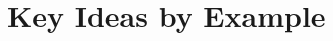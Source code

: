 \documentclass[acmsmall,review,anonymous]{acmart}\settopmatter{printfolios=true,printccs=false,printacmref=false}
\newcommand*{\rsp}{\textsc{sp}}
\begin{document}
%
%
%
%
%
%
%
%
%

\section{Key Ideas by Example}
\label{sec:running-example}

\newcommand{\mainsealc}{cyan}
\newcommand{\fsealc}{green}
\newcommand{\unsealc}{lgray}
\newcommand{\emptyoutc}{white} %
\newcommand{\fulloutc}{white}
\newcommand{\badc}{lred}
\newcommand{\goodc}{lblue}
\newcommand{\retptrc}{black}
\end{document}
